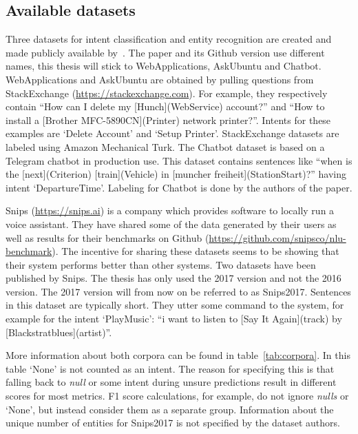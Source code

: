 \subsection{Available datasets}
\label{subsec:available_datasets}
Three datasets for intent classification and entity recognition are created and made publicly available by~\citet{braun2017}.
The paper and its Github version use different names, this thesis will stick to WebApplications, AskUbuntu and Chatbot.
WebApplications and AskUbuntu are obtained by pulling questions from StackExchange (\url{https://stackexchange.com}).
For example, they respectively contain ``How can I delete my [Hunch](WebService) account?'' and ``How to install a [Brother MFC-5890CN](Printer) network printer?''.
Intents for these examples are `Delete Account' and `Setup Printer'.
StackExchange datasets are labeled using Amazon Mechanical Turk.
The Chatbot dataset is based on a Telegram chatbot in production use.
This dataset contains sentences like ``when is the [next](Criterion) [train](Vehicle) in [muncher freiheit](StationStart)?'' having intent `DepartureTime'.
Labeling for Chatbot is done by the authors of the paper.

Snips (\url{https://snips.ai}) is a company which provides software to locally run a voice assistant.
They have shared some of the data generated by their users as well as results for their benchmarks on Github (\url{https://github.com/snipsco/nlu-benchmark}).
The incentive for sharing these datasets seems to be showing that their system performs better than other systems.
Two datasets have been published by Snips.
The thesis has only used the 2017 version and not the 2016 version.
The 2017 version will from now on be referred to as Snips2017.
Sentences in this dataset are typically short.
They utter some command to the system, for example for the intent `PlayMusic': ``i want to listen to [Say It Again](track) by [Blackstratblues](artist)''.

More information about both corpora can be found in table~\ref{tab:corpora}.
In this table `None' is not counted as an intent.
The reason for specifying this is that falling back to \textit{null} or some intent during unsure predictions result in different scores for most metrics.
F1 score calculations, for example, do not ignore \textit{nulls} or `None', but instead consider them as a separate group.
Information about the unique number of entities for Snips2017 is not specified by the dataset authors.

